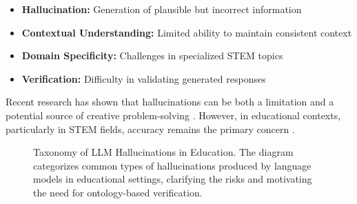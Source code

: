 \begin{itemize}
    \item \textbf{Hallucination:} Generation of plausible but incorrect information
    \item \textbf{Contextual Understanding:} Limited ability to maintain consistent context
    \item \textbf{Domain Specificity:} Challenges in specialized STEM topics
    \item \textbf{Verification:} Difficulty in validating generated responses
\end{itemize}

Recent research has shown that hallucinations can be both a limitation and a potential source of creative problem-solving \cite{su2024confabulation}. However, in educational contexts, particularly in STEM fields, accuracy remains the primary concern \cite{zuo2025medhallbench}.

\begin{figure}[ht]
    \centering
    \caption{Taxonomy of LLM Hallucinations in Education. The diagram categorizes common types of hallucinations produced by language models in educational settings, clarifying the risks and motivating the need for ontology-based verification.}
    \label{fig:llm-hallucination-taxonomy}
\end{figure}

